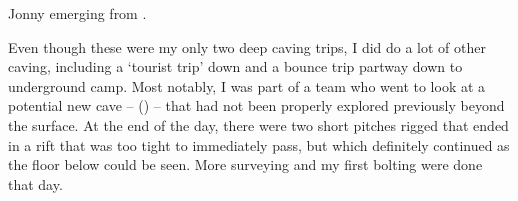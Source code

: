 \begin{marginfigure}
\checkoddpage \ifoddpage \forcerectofloat \else \forceversofloat \fi
\centering
 \caption{Jonny emerging from . }
 \label{N9 jonny}
\end{marginfigure}

Even though these were my only two deep caving trips, I did do a lot of other caving, including a ‘tourist trip’ down  and a bounce trip partway down to underground camp. Most notably, I was part of a team who went to look at a potential new cave --  () -- that had not been properly explored previously beyond the surface. At the end of the day, there were two short pitches rigged that ended in a rift that was too tight to immediately pass, but which definitely continued as the floor below could be seen. More surveying and my first bolting were done that day.

